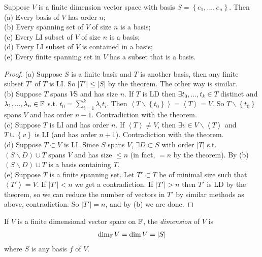 \documentclass[a4paper]{article}
\begin{document}
\begin{coro}
Suppose $V$ is a finite dimension vector space with basis $S = \left\{e_1,...,e_n\right\}$. Then\\
(a) Every basis of $V$ has order $n$;\\
(b) Every spanning set of $V$ of size $n$ is a basis;\\
(c) Every LI subset of $V$ of size $n$ is a basis;\\
(d) Every LI subset of $V$ is contained in a basis;\\
(e) Every finite spanning set in $V$ has a subset that is a basis.
\begin{proof}
(a) Suppose $S$ is a finite basis and $T$ is another basis, then any finite subset $T'$ of $T$ is LI. So $|T'| \leq |S|$ by the theorem. The other way is similar.\\
(b) Suppose $T$ spans $V$S and has size $n$. If $T$ is LD then $\exists t_0,...,t_k \in T$ distinct and $\lambda_1,...,\lambda_n \in \mathbb{F}$ s.t. $t_0 = \sum_{i=1}^k \lambda_i t_i$. Then $\left<T\backslash \left\{t_0\right\}\right> = \left<T\right> = V$. So $T \backslash \left\{ t_0\right\}$ spans $V$ and has order $n-1$. Contradiction with the theorem.\\
(c) Suppose $T$ is LI and has order $n$. If $\left<T\right> \neq V$, then $\exists v \in V \backslash \left<T\right>$ and $T \cup \left\{v\right\}$ is LI (and has order $n+1$). Contradiction with the theorem.\\
(d) Suppose $T \subset V$ is LI. Since $S$ spans $V$, $\exists D \subset S$ with order $|T|$ s.t. $\left(S \backslash D\right) \cup T$ spans $V$ and has size $\leq n$ (in fact, $=n$ by the theorem). By (b) $\left(S \backslash D\right) \cup T$ is a basis containing $T$.\\
(e) Suppose $T$ is a finite spanning set. Let $T' \subset T$ be of minimal size such that $\left<T'\right> = V$. If $|T'| < n$ we get a contradiction. If $|T'| > n$ then $T'$ is LD by the theorem, so we can reduce the number of vectors in $T'$ by similar methods as above, contradiction. So $|T'| = n$, and by (b) we are done.
\end{proof}
\end{coro}

\begin{defi}
If $V$ is a finite dimensional vector space on $\mathbb{F}$, the \emph{dimension} of $V$ is
\begin{equation*}
\begin{aligned}
\dim_{\mathbb{F}} V = \dim V = |S|
\end{aligned}
\end{equation*}
where $S$ is any basis $f$ of $V$.
\end{defi}
\end{document}
